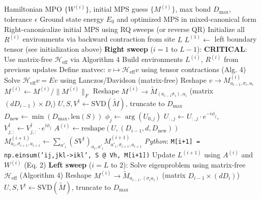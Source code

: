 \documentclass[aps,prb,onecolumn,scriptaddress]{revtex4-2}
\newcommand{\eps}{\epsilon}
\begin{document}
	\begin{algorithm}[H]
		\caption{SingleSiteDMRG (with Gauge Control)}
		\begin{algorithmic}[1]
			\Require Hamiltonian MPO $\{W^{(i)}\}$, initial MPS guess $\{M^{(i)}\}$, max bond $D_{\max}$, tolerance $\eps$
			\Ensure Ground state energy $E_0$ and optimized MPS in mixed-canonical form
			\State Right-canonicalize initial MPS using RQ sweeps (or reverse QR)
			\State Initialize all $R^{(i)}$ environments via backward contraction from site $L$
			\State $L^{(1)} \gets$ left boundary tensor (see initialization above)
			\State \textbf{Right sweep} ($i=1$ to $L-1$):
			\State \textbf{CRITICAL}: Use matrix-free $\mathcal{H}_{\text{eff}}$ via Algorithm 4
			\State {}
			\State {}
			\State Build environments $L^{(i)}$, $R^{(i)}$ from previous updates
			\State Define matvec: $v \mapsto \mathcal{H}_{\text{eff}}v$ using tensor contractions (Alg. 4)
			\State Solve $\mathcal{H}_{\text{eff}} v = E v$ using Lanczos/Davidson (matrix-free)
			\State Reshape $v \to M^{(i)}_{a_{i-1},\sigma_i,a_i}$
			\State $M^{(i)} \gets M^{(i)} / \|M^{(i)}\|_F$ 
			\State Reshape $M^{(i)} \to \tilde{M}_{(a_{i-1}\sigma_i), a_i}$ (matrix $(dD_{i-1}) \times D_i$)
			\State $U, S, V^\dagger \gets \text{SVD}(\tilde{M})$, truncate to $D_{\max}$
			\State $D_{\text{new}} \gets \min(D_{\max}, \text{len}(S))$
			\State {}
			\State $\phi_j \gets \arg(U_{0,j})$
			\State $U_{:,j} \gets U_{:,j} \cdot e^{-i\phi_j}$, $V^\dagger_{j,:} \gets V^\dagger_{j,:} \cdot e^{i\phi_j}$
			\EndFor
			\State $A^{(i)} \gets \text{reshape}(U, (D_{i-1}, d, D_{\text{new}}))$
			\State {}
			\State $M^{(i+1)}_{a_i,\sigma_{i+1},a_{i+1}} \gets \sum_{a'_i} (SV^\dagger)_{a_i,a'_i} M^{(i+1)}_{a'_i,\sigma_{i+1},a_{i+1}}$
			\State \textit{Python}: \texttt{M[i+1] = np.einsum('ij,jkl->ikl', S @ Vh, M[i+1])}
			\State Update $L^{(i+1)}$ using $A^{(i)}$ and $W^{(i)}$ (Eq. 2)
			\EndFor
			\State \textbf{Left sweep} ($i=L$ to $2$):
			\State Solve eigenproblem using matrix-free $\mathcal{H}_{\text{eff}}$ (Algorithm 4)
			\State Reshape $M^{(i)} \to \tilde{M}_{a_{i-1}, (\sigma_i a_i)}$ (matrix $D_{i-1} \times (dD_i)$)
			\State $U, S, V^\dagger \gets \text{SVD}(\tilde{M})$, truncate to $D_{\max}$

\end{algorithmic}
\end{algorithm}
\end{document}
